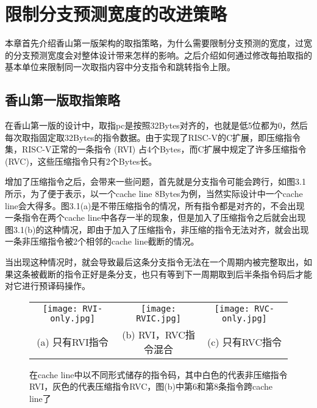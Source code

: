 \chapter{限制分支预测宽度的改进策略}

本章首先介绍香山第一版架构的取指策略，为什么需要限制分支预测的宽度，过宽的分支预测宽度会对整体设计带来怎样的影响。之后介绍如何通过修改每拍取指的基本单位来限制同一次取指内容中分支指令和跳转指令上限。

\section{香山第一版取指策略}

在香山第一版的设计中，取指pc是按照32Bytes对齐的，也就是低5位都为0，然后每次取指固定取32Bytes的指令数据。由于实现了RISC-V的C扩展，即压缩指令集，RISC-V正常的一条指令 (RVI) 占4个Bytes，而C扩展中规定了许多压缩指令 (RVC)，这些压缩指令只有2个Bytes长。

增加了压缩指令之后，会带来一些问题，首先就是分支指令可能会跨行，如图3.1所示，为了便于表示，以一个cache line 8Bytes为例，当然实际设计中一个cache line会大得多。图3.1(a)是不带压缩指令的情况，所有指令都是对齐的，不会出现一条指令在两个cache line中各存一半的现象，但是加入了压缩指令之后就会出现图3.1(b)的这种情况，即由于加入了压缩指令，非压缩的指令无法对齐，就会出现一条非压缩指令被2个相邻的cache line截断的情况。

当出现这种情况时，就会导致最后这条分支指令无法在一个周期内被完整取出，如果这条被截断的指令正好是条分支，也只有等到下一周期取到后半条指令码后才能对它进行预译码操作。

\begin{figure}[htb]
    \centering
    \setlength\tabcolsep{3pt}  %
    \vspace{5pt} %
    \begin{tabular}{ccc}
        \texttt{[image: RVI-only.jpg]} &
        \texttt{[image: RVIC.jpg]} &
        \texttt{[image: RVC-only.jpg]} \\
        (a) 只有RVI指令 & (b) RVI，RVC指令混合 & (c) 只有RVC指令 \\[1ex]
    \end{tabular}
    \caption{在cache line中以不同形式储存的指令码，其中白色的代表非压缩指令RVI，灰色的代表压缩指令RVC，图(b)中第6和第8条指令跨cache line了}
    \label{fig:figure1}
\end{figure}

